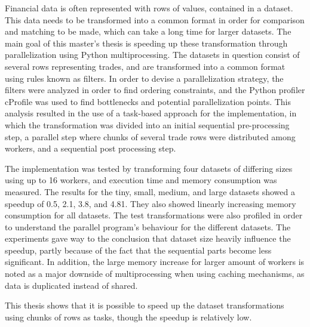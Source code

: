 Financial data is often represented with rows of values, contained in a dataset. This data needs to be transformed into a common format in order for
comparison and matching to be made, which can take a long time for larger datasets.
The main goal of this master’s thesis is speeding up these transformation through parallelization using Python multiprocessing.
The datasets in question consist of several rows representing trades, and are transformed into a common format using rules known as filters. In order to devise a
parallelization strategy, the filters were analyzed in order to find ordering constraints, and the Python profiler cProfile was used to find bottlenecks
and potential parallelization points. This analysis resulted in the use of a task-based approach for the implementation, in which the transformation
was divided into an initial sequential pre-processing step, a parallel step where chunks of several trade rows were distributed among workers, and a
sequential post processing step. 

The implementation was tested by transforming four datasets of differing sizes using up to 16 workers, and execution time and memory consumption
was measured. The results for the tiny, small, medium, and large datasets showed a speedup of 0.5, 2.1, 3.8, and 4.81. They also showed linearly increasing
memory consumption for all datasets.  The test transformations were also profiled in order to understand the parallel program’s behaviour for the
different datasets. The experiments gave way to the conclusion that dataset size heavily influence the speedup, partly because of the fact that
the sequential parts become less significant.  In addition, the large memory increase for larger amount of workers is noted as a major downside of
multiprocessing when using caching mechanisms, as data is duplicated instead of shared.

This thesis shows that it is possible to speed up the dataset transformations using chunks of rows as tasks, though the speedup is relatively low.
